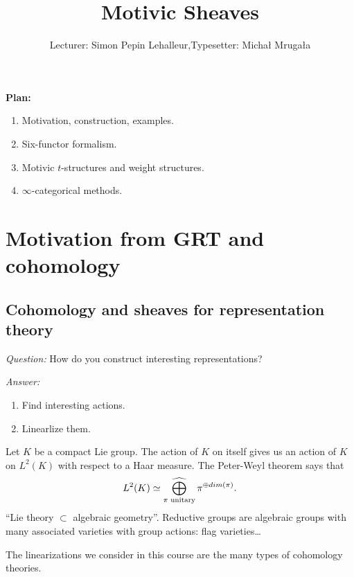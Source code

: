 

\usepackage{mathtools}

\def\Cone{\operatorname{Cone}}
\def\Ch{\cat{Ch}}
\def\ft{^{\text{(f.t)}}}
\def\Sm{\cat{Sm}}
\DeclareMathOperator{\hocolim}{hocolim}
\def\Sing{\operatorname{Sing}}
\def\F{\bb{F}}
\def\Ga{\mathbb{G}_a}
\def\Gm{\mathbb{G}_m}
\def\Fr{\operatorname{Fr}}
\def\PSp{\operatorname{PSp}}
\def\Sp{\operatorname{Sp}}
\def\Ev{\operatorname{Ev}}
\def\Sus{\operatorname{Sus}}
\def\Et{\cat{Et}}
\def\Ind{\operatorname{Ind}}
\def\rank{\operatorname{rank}}
\def\Bl{\operatorname{Bl}}
\def\Sch{\cat{Sch}}
\def\kz{\mathfrak{z}}
\def\Chow{\operatorname{CH}}
\def\Sym{\operatorname{Sym}}
\def\kg{\mathfrak{g}}
\def\PrL{\operatorname{Pr}^L}

\title{Motivic Sheaves}
\author{Lecturer: Simon Pepin Lehalleur,\quad Typesetter: Micha{\l} Mruga{\l}a}


\maketitle
\textbf{Plan:}
\begin{enumerate}[L1:]
	\item Motivation, construction, examples.
	\item Six-functor formalism.
	\item Motivic $t$-structures and weight structures.
	\item $\infty$-categorical methods.
\end{enumerate}
\section{Motivation from GRT and cohomology}
\subsection{Cohomology and sheaves for representation theory} \leavevmode


\emph{Question:} How do you construct interesting representations?

\emph{Answer:}
\begin{enumerate}[1)]
	\item Find interesting actions.
	\item Linearlize them.
\end{enumerate}

\begin{example}
	Let $K$ be a compact Lie group. The action of $K$ on itself gives us an action of $K$ on $L^2(K)$ with respect to a Haar measure. The Peter-Weyl theorem says that
	\[
	L^2(K) \isoto \cbigoplus_{\pi\text{ unitary}}\pi^{\oplus dim(\pi)}.
	\]
	``Lie theory $\subset $ algebraic geometry''. Reductive groups are algebraic groups with many associated varieties with group actions: flag varieties\dots
\end{example}
The linearizations we consider in this course are the many types of cohomology theories.

